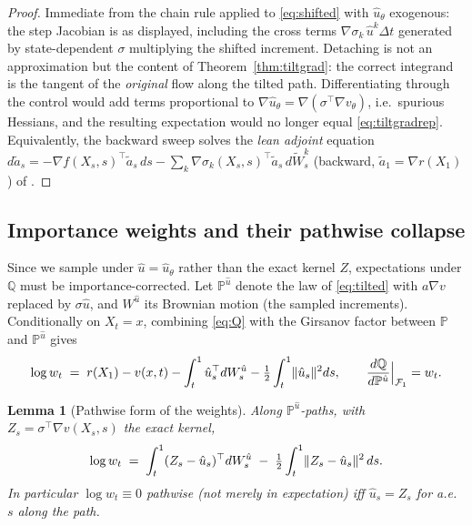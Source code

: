 \documentclass[11pt]{article}
\newtheorem{lemma}[theorem]{Lemma}
\theoremstyle{definition}
\theoremstyle{remark}
\newcommand{\Q}{\mathbb{Q}}
\newcommand{\Pmeas}{\mathbb{P}}
\newcommand{\F}{\mathcal{F}}
\newcommand{\grad}{\nabla}
\newcommand{\uhat}{\hat{u}}
\DeclarePairedDelimiter{\norm}{\lVert}{\rVert}
\begin{document}
\begin{proof}
Immediate from the chain rule applied to \eqref{eq:shifted} with $\uhat_\theta$ exogenous:
the step Jacobian is as displayed, including the cross terms
$\grad\sigma_k\,\uhat^k\Delta t$ generated by state-dependent $\sigma$ multiplying the
shifted increment. Detaching is not an approximation but the content of
Theorem~\ref{thm:tiltgrad}: the correct integrand is the tangent of the \emph{original} flow
along the tilted path. Differentiating through the control would add terms proportional to
$\grad \uhat_\theta = \grad(\sigma^\top\grad v_\theta)$, i.e.\ spurious Hessians, and the
resulting expectation would no longer equal \eqref{eq:tiltgradrep}. Equivalently, the
backward sweep solves the \emph{lean adjoint} equation
$d\tilde a_s = -\grad f(X_s,s)^\top \tilde a_s\,ds - \sum_k \grad\sigma_k(X_s,s)^\top
\tilde a_s\, d\widetilde W^k_s$ (backward, $\tilde a_1 = \grad r(X_1)$) of
\cite{AdjointMatching}.
\end{proof}

\subsection{Importance weights and their pathwise collapse}

Since we sample under $\uhat = \uhat_\theta$ rather than the exact kernel $Z$, expectations
under $\Q$ must be importance-corrected. Let $\Pmeas^{\uhat}$ denote the law of
\eqref{eq:tilted} with $a\grad v$ replaced by $\sigma\uhat$, and $W^{\uhat}$ its Brownian
motion (the sampled increments). Conditionally on $X_t = x$, combining \eqref{eq:Q} with the
Girsanov factor between $\Pmeas$ and $\Pmeas^{\uhat}$ gives
\begin{equation}\label{eq:logw}
\log w_t \;=\; r(X_1) - v(x,t)
- \int_t^1 \uhat_s^\top dW^{\uhat}_s - \tfrac12\int_t^1 \norm{\uhat_s}^2 ds ,
\qquad
\frac{d\Q}{d\Pmeas^{\uhat}}\Big|_{\F_1} = w_t .
\end{equation}

\begin{lemma}[Pathwise form of the weights]\label{lem:weights}
Along $\Pmeas^{\uhat}$-paths, with $Z_s = \sigma^\top\grad v(X_s,s)$ the exact kernel,
\begin{equation}\label{eq:residualweight}
\log w_t \;=\; \int_t^1 (Z_s - \uhat_s)^\top dW^{\uhat}_s
\;-\; \tfrac12 \int_t^1 \norm{Z_s - \uhat_s}^2\, ds .
\end{equation}
In particular $\log w_t \equiv 0$ \emph{pathwise} (not merely in expectation) iff
$\uhat_s = Z_s$ for a.e.\ $s$ along the path.
\end{lemma}
\end{document}
